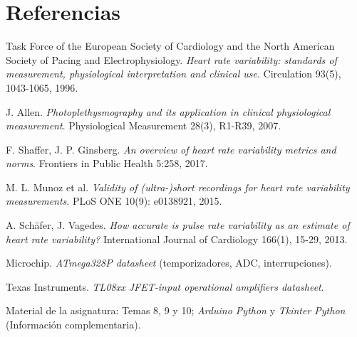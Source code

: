 \documentclass[11pt,a4paper]{article}
\begin{document}
\section{Referencias}

\begin{enumerate}[leftmargin=1.6em,itemsep=2pt,topsep=2pt,label={[\arabic*]}]
  \item Task Force of the European Society of Cardiology and the North American Society of
        Pacing and Electrophysiology. \emph{Heart rate variability: standards of measurement,
        physiological interpretation and clinical use}. Circulation 93(5), 1043-1065, 1996.
  \item J. Allen. \emph{Photoplethysmography and its application in clinical physiological
        measurement}. Physiological Measurement 28(3), R1-R39, 2007.
  \item F. Shaffer, J. P. Ginsberg. \emph{An overview of heart rate variability metrics and
        norms}. Frontiers in Public Health 5:258, 2017.
  \item M. L. Munoz et al. \emph{Validity of (ultra-)short recordings for heart rate
        variability measurements}. PLoS ONE 10(9): e0138921, 2015.
  \item A. Schäfer, J. Vagedes. \emph{How accurate is pulse rate variability as an estimate of
        heart rate variability?} International Journal of Cardiology 166(1), 15-29, 2013.
  \item Microchip. \emph{ATmega328P datasheet} (temporizadores, ADC, interrupciones).
  \item Texas Instruments. \emph{TL08xx JFET-input operational amplifiers datasheet}.
  \item Material de la asignatura: Temas 8, 9 y 10; \emph{Arduino Python} y
        \emph{Tkinter Python} (Información complementaria).
\end{enumerate}
\end{document}
